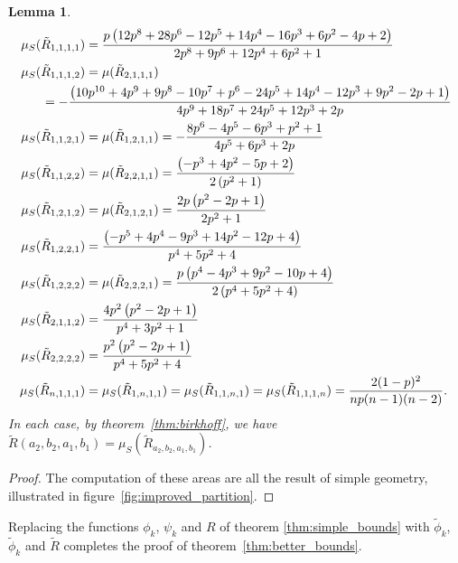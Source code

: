 \documentclass{iopart}
\newtheorem{lemma}{Lemma}
\begin{document}
\begin{lemma}\label{lem:R_HR}
\begin{align*}
\mu_S(\tilde{R}_{1,1,1,1}) &= \frac{p \left(12 p^{8} + 28 p^{6} - 12 p^{5} + 14 p^{4} - 16 p^{3} + 6 p^{2} - 4 p + 2\right)}{2 p^{8} + 9 p^{6} + 
12 p^{4} + 6 p^{2} + 1} \\
\mu_S(\tilde{R}_{1,1,1,2}) &= \mu(\tilde{R}_{2,1,1,1}) \\
&\hspace{-8ex} = - \frac{\left(10 p^{10} + 4 p^{9} + 9 p^{8} - 10 p^{7} 
+ p^{6} - 24 p^{5} + 14 p^{4} - 12 p^{3} + 9 p^{2} - 2 p + 1\right)}{4 p^{9} + 18 p^{7} + 24 p^{5} + 12 p^{3} + 2p}   \\
\mu_S(\tilde{R}_{1,1,2,1}) &=\mu(\tilde{R}_{1,2,1,1}) =   - \frac{8 p^{6} - 4 p^{5} - 6 p^{3} + p^{2} + 1}{4 p^{5} + 6 p^{3} + 2p} \\
\mu_S(\tilde{R}_{1,1,2,2}) &=\mu(\tilde{R}_{2,2,1,1}) =  \frac{ \left(- p^{3} + 4 p^{2} - 5 p + 2\right)}{2 \left(p^{2} + 1\right)}  \\
\mu_S(\tilde{R}_{1,2,1,2}) &=\mu(\tilde{R}_{2,1,2,1}) =  \frac{2 p \left(p^{2} - 2 p + 1\right)}{2 p^{2} + 1}  \\
\mu_S(\tilde{R}_{1,2,2,1}) &=  \frac{ \left(- p^{5} + 4 p^{4} - 9 p^{3} 
+ 14 p^{2} - 12 p + 4\right)}{p^{4} + 5 p^{2} + 4}  \\
\mu_S(\tilde{R}_{1,2,2,2}) &= \mu(\tilde{R}_{2,2,2,1}) = \frac{p \left(p^{4} - 4 p^{3} + 9 p^{2} - 10 p + 4\right)}{2 \left(p^{4} + 5 p^{2} + 4\right)}   \\
\mu_S(\tilde{R}_{2,1,1,2}) &= \frac{4 p^{2} \left(p^{2} - 2 p + 1\right)}{p^{4} + 3 p^{2} + 1}   \\
\mu_S(\tilde{R}_{2,2,2,2}) &=   \frac{p^{2} \left(p^{2} - 2 p + 1\right)}{p^{4} + 5 p^{2} + 4}  \\
\mu_S(\tilde{R}_{n,1,1,1}) &= \mu_S(\tilde{R}_{1,n,1,1}) = \mu_S(\tilde{R}_{1,1,n,1}) = \mu_S(\tilde{R}_{1,1,1,n}) = \frac{2(1-p)^2}{np(n-1)(n-2)}.
\end{align*}
In each case, by theorem~\ref{thm:birkhoff}, we have $\tilde{R}(a_2,b_2,a_1,b_1) = \mu_S( \tilde{R}_{a_2,b_2,a_1,b_1})$. 
\end{lemma}

\begin{proof}
The computation of these areas are all the result of simple geometry, illustrated in figure~\ref{fig:improved_partition}. 
\end{proof}

Replacing the functions $\phi_k$, $\psi_k$ and $R$ of theorem \ref{thm:simple_bounds} with $\tilde{\phi}_k$, $\tilde{\phi}_k$ and $\tilde{R}$ completes the proof of theorem~\ref{thm:better_bounds}.
\end{document}
